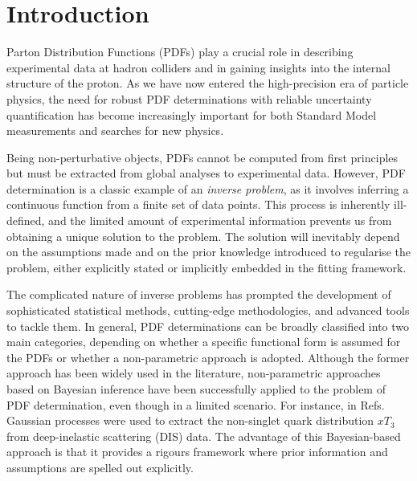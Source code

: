 \section{Introduction}
\label{sec:intro}

Parton Distribution Functions (PDFs) play a crucial role in describing
experimental data at hadron colliders and in gaining insights into the internal
structure of the proton. As we have now entered the high-precision era of
particle physics, the need for robust PDF determinations with reliable
uncertainty quantification has become increasingly important for both Standard
Model measurements and searches for new physics.

Being non-perturbative objects, PDFs cannot be computed from first principles
but must be extracted from global analyses to experimental data. However, PDF
determination is a classic example of an \textit{inverse problem}, as it
involves inferring a continuous function from a finite set of data points. This
process is inherently ill-defined, and the limited amount of experimental
information prevents us from obtaining a unique solution to the problem. The
solution will inevitably depend on the assumptions made and on the prior
knowledge introduced to regularise the problem, either explicitly stated or
implicitly embedded in the fitting framework.

The complicated nature of inverse problems has prompted the development of
sophisticated statistical methods, cutting-edge methodologies, and advanced
tools to tackle them. In general, PDF determinations can be broadly classified
into two main categories, depending on whether a specific functional form is
assumed for the PDFs or whether a non-parametric approach is adopted. Although
the former approach has been widely used in the literature, non-parametric
approaches based on Bayesian inference have been successfully applied to the
problem of PDF determination, even though in a limited scenario. For instance,
in Refs.~\cite{DelDebbio:2021whr,Candido:2024hjt} Gaussian processes were used
to extract the non-singlet quark distribution $xT_3$ from deep-inelastic
scattering (DIS) data. The advantage of this Bayesian-based approach is that it
provides a rigours framework where prior information and assumptions are spelled
out explicitly.

